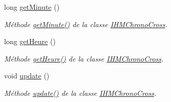 \begin{DoxyCompactItemize}
long \hyperlink{class_i_h_m_chrono_cross_a0cee9742e561398390bedb29ef7d6258}{get\+Minute} ()
\begin{DoxyCompactList}\small\item\em Méthode \hyperlink{class_i_h_m_chrono_cross_a0cee9742e561398390bedb29ef7d6258}{get\+Minute()} de la classe \hyperlink{class_i_h_m_chrono_cross}{I\+H\+M\+Chrono\+Cross}. \end{DoxyCompactList}\item 
long \hyperlink{class_i_h_m_chrono_cross_a42054b4d5246c939bf0f621edb0e1aae}{get\+Heure} ()
\begin{DoxyCompactList}\small\item\em Méthode \hyperlink{class_i_h_m_chrono_cross_a42054b4d5246c939bf0f621edb0e1aae}{get\+Heure()} de la classe \hyperlink{class_i_h_m_chrono_cross}{I\+H\+M\+Chrono\+Cross}. \end{DoxyCompactList}\item 
void \hyperlink{class_i_h_m_chrono_cross_a2cc8b686168528ab0d642a0cba6e1c5a}{update} ()
\begin{DoxyCompactList}\small\item\em Méthode \hyperlink{class_i_h_m_chrono_cross_a2cc8b686168528ab0d642a0cba6e1c5a}{update()} de la classe \hyperlink{class_i_h_m_chrono_cross}{I\+H\+M\+Chrono\+Cross}. \end{DoxyCompactList}\end{DoxyCompactItemize}
